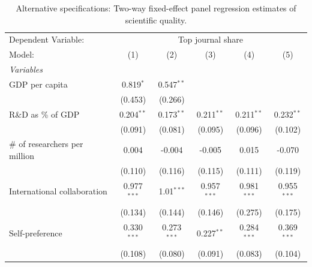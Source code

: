 
\begin{table}[H]
   \caption{\label{tab:alternatives} Alternative specifications: Two-way fixed-effect panel regression estimates of scientific quality.}
   \centering
   \renewcommand*{\arraystretch}{0.7}
   \begin{tabular}{lccccc}
      \tabularnewline \midrule \midrule
      Dependent Variable: & \multicolumn{5}{c}{Top journal share}\\
      Model:                                                              & (1)           & (2)           & (3)           & (4)           & (5)\\  
      \midrule
      \emph{Variables}\\
      GDP per capita                                                      & 0.819$^{*}$   & 0.547$^{**}$  &               &               &   \\   
                                                                          & (0.453)       & (0.266)       &               &               &   \\   
      R\&D as \% of GDP                                                   & 0.204$^{**}$  & 0.173$^{**}$  & 0.211$^{**}$  & 0.211$^{**}$  & 0.232$^{**}$\\   
                                                                          & (0.091)       & (0.081)       & (0.095)       & (0.096)       & (0.102)\\   
      \# of researchers per million                                       & 0.004         & -0.004        & -0.005        & 0.015         & -0.070\\   
                                                                          & (0.110)       & (0.116)       & (0.115)       & (0.111)       & (0.119)\\   
      International collaboration                                         & 0.977$^{***}$ & 1.01$^{***}$  & 0.957$^{***}$ & 0.981$^{***}$ & 0.955$^{***}$\\   
                                                                          & (0.134)       & (0.144)       & (0.146)       & (0.275)       & (0.175)\\   
      Self-preference                                                     & 0.330$^{***}$ & 0.273$^{***}$ & 0.227$^{**}$  & 0.284$^{***}$ & 0.369$^{***}$\\   
                                                                          & (0.108)       & (0.080)       & (0.091)       & (0.083)       & (0.104)\\   

\end{tabular}
\end{table}

